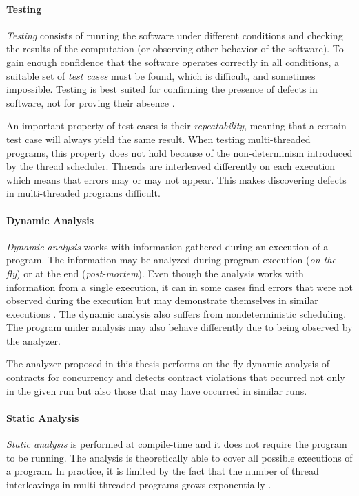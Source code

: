 \paragraph{Testing}
\emph{Testing} consists of running the software under different conditions and
checking the results of the computation (or observing other behavior of the
software). To gain enough confidence that the software operates correctly in all
conditions, a suitable set of \emph{test cases} must be found, which is
difficult, and sometimes impossible. Testing is best suited for confirming
the presence of defects in software, not for proving their absence
\cite{fundamentals}.

An important property of test cases is their \emph{repeatability}, meaning that
a certain test case will always yield the same result. When testing
multi-threaded programs, this property does not hold because of the
non-determinism introduced by the thread scheduler. Threads are interleaved
differently on each execution which means that errors may or may not appear.
This makes discovering defects in multi-threaded programs difficult.

\paragraph{Dynamic Analysis}
\emph{Dynamic analysis} works with information gathered during an execution of a
program. The information may be analyzed during program execution
(\emph{on-the-fly}) or at the end (\emph{post-mortem}). Even though the analysis
works with information from a single execution, it can in some cases find errors
that were not observed during the execution but may demonstrate themselves in
similar executions \cite{letko}. The dynamic analysis also suffers from
nondeterministic scheduling. The program under analysis may also behave
differently due to being observed by the analyzer.

The analyzer proposed in this thesis performs on-the-fly dynamic analysis of
contracts for concurrency and detects contract violations that occurred not only
in the given run but also those that may have occurred in similar runs.

\paragraph{Static Analysis}
\emph{Static analysis} is performed at compile-time and it does not require the
program to be running. The analysis is theoretically able to cover all possible
executions of a program. In practice, it is limited by the fact that the number
of thread interleavings in multi-threaded programs grows exponentially
\cite{letko}.

